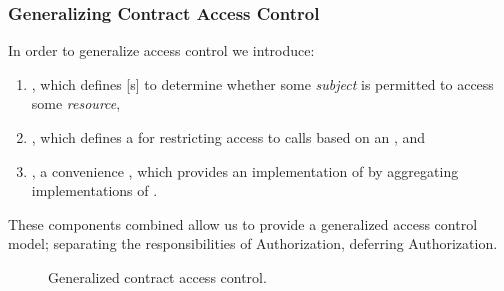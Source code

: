 \subsubsection{Generalizing Contract Access Control}

In order to generalize  access control we introduce:

\begin{enumerate}
  \item {}, which defines [s] to
    determine whether some \emph{subject} is permitted to access some
    \emph{resource},
  \item {}, which defines a  for
    restricting access to  calls based on an , and
  \item {}, a convenience , which provides an
    implementation of  by aggregating
    implementations of .
\end{enumerate}

These components combined allow us to provide a generalized access control
model; separating the responsibilities of Authorization, deferring
Authorization.\footnotemark{}


\begin{figure}[H]
    \centering
    \caption{Generalized contract access control.}%
\end{figure}






